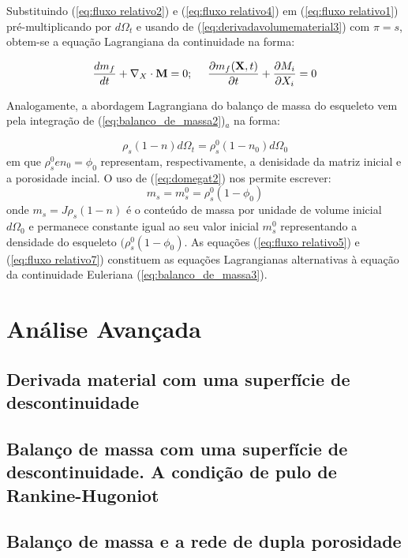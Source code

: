 \documentclass[
	11pt, %
	fleqn, %
	a4paper, %
]{LegrandOrangeBook}
\begin{document}
Substituindo (\ref{eq:fluxo relativo2}) e (\ref{eq:fluxo relativo4}) em (\ref{eq:fluxo relativo1}) pré-multiplicando por $d\Omega_t$ e usando de (\ref{eq:derivadavolumematerial3}) com $\pi = s$, obtem-se a equação Lagrangiana da continuidade na forma:

\begin{equation}
	\label{eq:fluxo relativo5}	
	\dfrac{dm_f}{dt} + \nabla_X \cdot \textbf{M} = 0; ~~~~ \dfrac{\partial m_f(\textbf{X},t)}{\partial t} + \dfrac{\partial M_i}{\partial X_i} = 0
\end{equation}

Analogamente, a abordagem Lagrangiana do balanço de massa do esqueleto vem pela integração de (\ref{eq:balanco_de_massa2})$_a$ na forma:

\begin{equation}
	\label{eq:fluxo relativo6}	
	\rho_s(1-n)d\Omega_t = \rho_s^0(1-n_0)d\Omega_0
\end{equation}
em que $\rho_s^0 e n_0 = \phi_0$ representam, respectivamente, a denisidade da matriz inicial e a porosidade incial. O uso de (\ref{eq:domegat2}) nos permite escrever:
\begin{equation}
	\label{eq:fluxo relativo7}	
	m_s = m_s^0 = \rho_s^0(1-\phi_0)
\end{equation}
onde $m_s = J\rho_s(1-n)$ é o conteúdo de massa por unidade de volume inicial $d\Omega_0$ e permanece constante igual ao seu valor inicial $m_s^0$ representando a densidade do esqueleto $(\rho_s^0(1-\phi_0)$. As equações (\ref{eq:fluxo relativo5}) e (\ref{eq:fluxo relativo7}) constituem as equações Lagrangianas alternativas à  equação da continuidade Euleriana (\ref{eq:balanco_de_massa3}).

\section{Análise Avançada}

\subsection{Derivada material com uma superfície de descontinuidade}
\subsection{Balanço de massa com uma superfície de descontinuidade. A condição de pulo de Rankine-Hugoniot}
\subsection{Balanço de massa e a rede de dupla porosidade}
\end{document}

